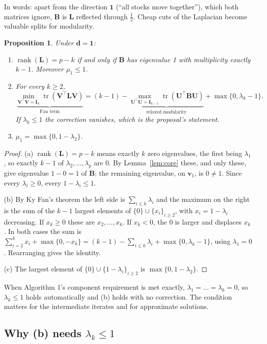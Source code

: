 \documentclass[11pt,a4paper]{article}
\newcommand{\Lap}{\mathbf{L}}
\newcommand{\Bmat}{\mathbf{B}}
\newcommand{\Imat}{\mathbf{I}}
\newcommand{\Vmat}{\mathbf{V}}
\newcommand{\Umat}{\mathbf{U}}
\newcommand{\dvec}{\mathbf{d}}
\newcommand{\vvec}{\mathbf{v}}
\newcommand{\one}{\mathbf{1}}
\newcommand{\tr}{\operatorname{tr}}
\newtheorem{proposition}{Proposition}
\theoremstyle{remark}
\begin{document}
In words: apart from the direction $\one$ (``all stocks move together''), which both
matrices ignore, $\Bmat$ is $\Lap$ reflected through $\tfrac12$. Cheap cuts of the
Laplacian become valuable splits for modularity.

\begin{proposition}\label{prop:lemma}
Under $\dvec=\one$:
\begin{enumerate}[label=(\alph*)]
\item $\operatorname{rank}(\Lap)=p-k$ if and only if $\Bmat$ has eigenvalue 1 with
  multiplicity exactly $k-1$. Moreover $\mu_1\le1$.
\item For every $k\ge2$,
  \[
    \underbrace{\min_{\Vmat^\top\Vmat=\Imat_k}\tr(\Vmat^\top\Lap\Vmat)}_{\text{Fan term}}
    =(k-1)-\underbrace{\max_{\Umat^\top\Umat=\Imat_{k-1}}\tr(\Umat^\top\Bmat\Umat)}_{\text{relaxed modularity}}
    +\max\{0,\lambda_k-1\}.
  \]
  If $\lambda_k\le1$ the correction vanishes, which is the proposal's statement.
\item $\mu_1=\max\{0,1-\lambda_2\}$.
\end{enumerate}
\end{proposition}
\begin{proof}
(a) $\operatorname{rank}(\Lap)=p-k$ means exactly $k$ zero eigenvalues, the first being
$\lambda_1$, so exactly $k-1$ of $\lambda_2,\dots,\lambda_p$ are 0. By
Lemma~\ref{lem:core} these, and only these, give eigenvalue $1-0=1$ of $\Bmat$; the
remaining eigenvalue, on $\vvec_1$, is $0\ne1$. Since every $\lambda_i\ge0$, every
$1-\lambda_i\le1$.

(b) By Ky Fan's theorem the left side is $\sum_{i\le k}\lambda_i$ and the maximum on the
right is the sum of the $k-1$ largest elements of $\{0\}\cup\{x_i\}_{i\ge2}$, with
$x_i=1-\lambda_i$ decreasing. If $x_k\ge0$ these are $x_2,\dots,x_k$. If $x_k<0$, the
0 is larger and displaces $x_k$. In both cases the sum is
$\sum_{i=2}^kx_i+\max\{0,-x_k\}=(k-1)-\sum_{i\le k}\lambda_i+\max\{0,\lambda_k-1\}$,
using $\lambda_1=0$. Rearranging gives the identity.

(c) The largest element of $\{0\}\cup\{1-\lambda_i\}_{i\ge2}$ is $\max\{0,1-\lambda_2\}$.
\end{proof}

When Algorithm 1's component requirement is met exactly, $\lambda_1=\dots=\lambda_k=0$,
so $\lambda_k\le1$ holds automatically and (b) holds with no correction. The condition
matters for the intermediate iterates and for approximate solutions.

\subsection{Why (b) needs $\lambda_k\le1$}\label{sec:role}
\end{document}
